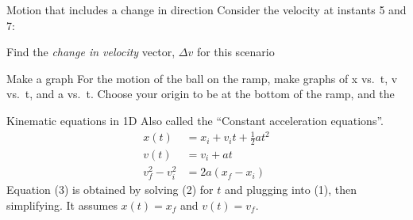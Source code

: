 \documentclass{beamer}
\begin{document}
\begin{frame}
  {Motion that includes a change in direction}
  Consider the velocity at instants 5 and 7:
  \begin{center}
  \end{center}
  Find the \textit{change in velocity} vector, $\Delta v$ for this scenario

\end{frame}

\begin{frame}
  {Make a graph}
  For the motion of the ball on the ramp, make graphs of x vs.\ t, v vs.\ t, and a vs.\
  t. Choose your origin to be at the bottom of the ramp, and the 
\end{frame}

\begin{frame}
  {Kinematic equations in 1D}
  Also called the ``Constant acceleration equations''.
  \begin{align}
    x(t) &= x_i + v_it + \frac{1}{2}a t^2 \\
    v(t) &= v_i + at \\
    v_f^2-v_i^2 &= 2 a (x_f-x_i)
  \end{align}
  Equation (3) is obtained by solving (2) for $t$ and plugging into (1), then simplifying. It
  assumes $x(t)=x_f$ and $v(t)=v_f$.
\end{frame}
\end{document}
